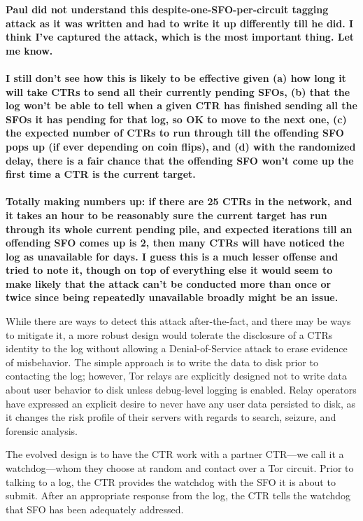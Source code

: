 {\bf \color{red} Paul did not understand this
  despite-one-SFO-per-circuit tagging attack as it was written and had
  to write it up differently till he did. I think I've captured the
  attack, which is the most important thing. Let me know.\\ \\
  I still don't see how this is likely to be effective given (a) how long it
  will take CTRs to send all their currently pending SFOs, (b) that the log
  won't be able to tell when a given CTR has finished sending all the SFOs it
  has pending for that log, so OK to move to the next one, (c) the expected
  number of CTRs to run through till the offending SFO pops up (if ever
  depending on coin flips), and (d) with the randomized delay, there is a fair
  chance that the offending SFO won't come up the first time a CTR is the
  current target.\\ \\
  Totally making numbers up: if there are 25 CTRs in the network, and
  it takes an hour to be reasonably sure the current target has run
  through its whole current pending pile, and expected iterations till
  an offending SFO comes up is 2, then many CTRs will have noticed
  the log as unavailable for days. I guess this is a much lesser
  offense and tried to note it, though on top of everything else
  it would seem to make likely that the attack can't be conducted
  more than once or twice since being repeatedly unavailable broadly
  might be an issue.}


While there are ways to detect this attack after-the-fact, and there may be ways
to mitigate it, a more robust design would tolerate the disclosure of a CTRs
identity to the log without allowing a Denial-of-Service attack to erase
evidence of misbehavior.  The simple approach is to write the data to disk prior
to contacting the log; however, Tor relays are explicitly designed not to write
data about user behavior to disk unless debug-level logging is enabled. Relay
operators have expressed an explicit desire to never have any user data
persisted to disk, as it changes the risk profile of their servers with regards
to search, seizure, and forensic analysis.

The evolved design is to have the CTR work with a partner CTR---we call it a
watchdog---whom they choose at random and contact over a Tor circuit. Prior to
talking to a log, the CTR provides the watchdog with the SFO it is about to
submit. After an appropriate response from the log, the CTR tells the watchdog
that SFO has been adequately addressed.

